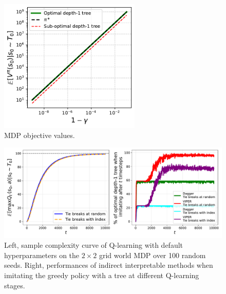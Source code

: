 \begin{figure}
    \centering
    \includegraphics[width=0.6\textwidth]{images/images_part1/policy_values_comparison.pdf}
    \caption{MDP objective values.}\label{fig:objectives}
\end{figure}

\begin{figure}
    \centering
    \includegraphics[width=1\textwidth]{images/images_part1/base_mdp.pdf}
    \caption{Left, sample complexity curve of Q-learning with default hyperparameters on the $2\times 2$ grid world MDP over 100 random seeds. Right, performances of indirect interpretable methods when imitating the greedy policy with a tree at different Q-learning stages. }
\end{figure}
